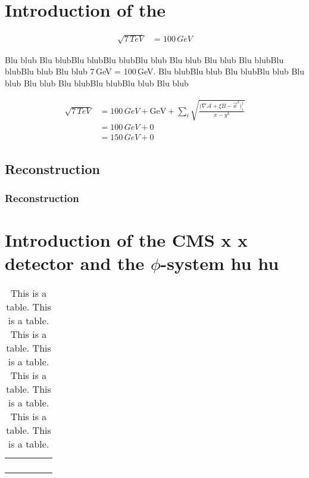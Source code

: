 \chapter{Introduction of the}

\lipsum[1]

\begin{align}
\sqrt{7\,TeV} & =100\,{GeV}
\end{align}


\lipsum[4]

\lipsum[2]

\lipsum[1] Blu blub Blu blubBlu blubBlu blubBlu blub Blu blub Blu blub Blu blubBlu blubBlu blub Blu blub 7\,GeV = 100\,GeV. Blu blubBlu blub Blu blubBlu blub Blu blub Blu blub Blu blubBlu blubBlu blub Blu blub

\begin{align}
\sqrt{7\,TeV}&=100\,{GeV}+\mathrm{GeV}+\sum_{i}\sqrt{\frac{\Big(\nabla\mathcal{A}+\xi{B}-\vec{x}^{2}\Big)_{i}^{\dagger}}{x-y^{3}}} \\
&=100\,{GeV}+0 \\
&=150\,{GeV}+0
\end{align}


\lipsum[4]


\section{Reconstruction}


\subsection{Reconstruction}

\lipsum[2]

\lipsum[1]


\chapter{Introduction of the CMS x x detector and the $\phi$-system hu hu}

\lipsum[4]

\lipsum[2]

\lipsum[2]

\lipsum[1]

\lipsum[2]

\begin{table}[th]
\caption{This is a table. This is a table. This is a table. This is a table.
This is a table. This is a table. This is a table. This is a table.}


\centering{}%
\begin{tabular}{|c|c|c|c|c|}
\hline 
 &  &  &  & \tabularnewline
\hline 
\hline 
 &  &  &  & \tabularnewline
\hline 
 &  &  &  & \tabularnewline
\hline 
 &  &  &  & \tabularnewline
\hline 
 &  &  &  & \tabularnewline
\hline 
\end{tabular}
\end{table}


